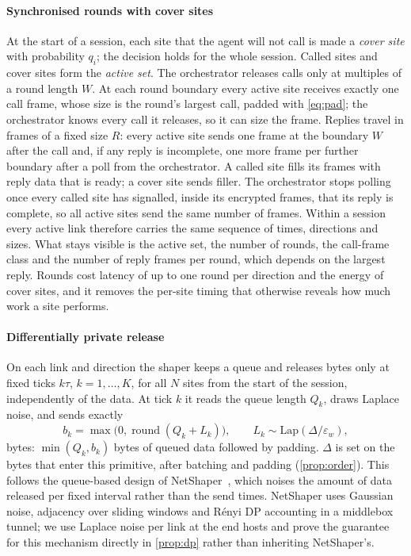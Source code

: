 \paragraph{Synchronised rounds with cover sites} At the start of a session, each site that the agent will not call is made a \emph{cover site} with probability $q_i$; the decision holds for the whole session. Called sites and cover sites form the \emph{active set}. The orchestrator releases calls only at multiples of a round length $W$. At each round boundary every active site receives exactly one call frame, whose size is the round's largest call, padded with \cref{eq:pad}; the orchestrator knows every call it releases, so it can size the frame. Replies travel in frames of a fixed size $R$: every active site sends one frame at the boundary $W$ after the call and, if any reply is incomplete, one more frame per further boundary after a poll from the orchestrator. A called site fills its frames with reply data that is ready; a cover site sends filler. The orchestrator stops polling once every called site has signalled, inside its encrypted frames, that its reply is complete, so all active sites send the same number of frames. Within a session every active link therefore carries the same sequence of times, directions and sizes. What stays visible is the active set, the number of rounds, the call-frame class and the number of reply frames per round, which depends on the largest reply. Rounds cost latency of up to one round per direction and the energy of cover sites, and it removes the per-site timing that otherwise reveals how much work a site performs.

\paragraph{Differentially private release} On each link and direction the shaper keeps a queue and releases bytes only at fixed ticks $k\tau$, $k=1,\dots,K$, for all $N$ sites from the start of the session, independently of the data. At tick $k$ it reads the queue length $Q_k$, draws Laplace noise, and sends exactly
\begin{equation}\label{eq:dp}
b_k=\max\bigl(0,\operatorname{round}(Q_k+L_k)\bigr),\qquad L_k\sim\mathrm{Lap}(\Delta/\varepsilon_w),
\end{equation}
bytes: $\min(Q_k,b_k)$ bytes of queued data followed by padding. $\Delta$ is set on the bytes that enter this primitive, after batching and padding (\cref{prop:order}). This follows the queue-based design of NetShaper~\cite{sabzi2024netshaper}, which noises the amount of data released per fixed interval rather than the send times. NetShaper uses Gaussian noise, adjacency over sliding windows and R\'enyi DP accounting in a middlebox tunnel; we use Laplace noise per link at the end hosts and prove the guarantee for this mechanism directly in \cref{prop:dp} rather than inheriting NetShaper's.

